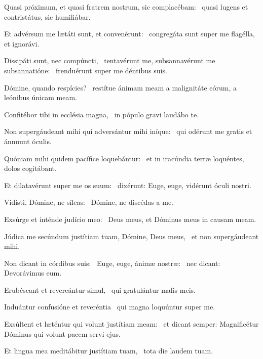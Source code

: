 \item Quasi próximum, et quasi fratrem nostrum, sic complacébam:~\psstar{} quasi lugens et contristátus, sic humiliábar.

\item Et advérsum me lætáti sunt, et convenérunt:~\psstar{} congregáta sunt super me flagélla, et ignorávi.

\item Dissipáti sunt, nec compúncti,~\pscross{} tentavérunt me, subsannavérunt me subsannatióne:~\psstar{} frenduérunt super me déntibus suis.

\item Dómine, quando respícies?~\psstar{} restítue ánimam meam a malignitáte eórum, a leónibus únicam meam.

\item Confitébor tibi in ecclésia magna,~\psstar{} in pópulo gravi laudábo te.

\item Non supergáudeant mihi qui adversántur mihi iníque:~\psstar{} qui odérunt me gratis et ánnuunt óculis.

\item Quóniam mihi quidem pacífice loquebántur:~\psstar{} et in iracúndia terræ loquéntes, dolos cogitábant.

\item Et dilatavérunt super me os suum:~\psstar{} dixérunt: Euge, euge, vidérunt óculi nostri.

\item Vidísti, Dómine, ne síleas:~\psstar{} Dómine, ne discédas a me.

\item Exsúrge et inténde judício meo:~\psstar{} Deus meus, et Dóminus meus in causam meam.

\item Júdica me secúndum justítiam tuam, Dómine, Deus meus,~\psstar{} et non supergáudeant mihi.

\item Non dicant in córdibus suis:~\pscross{} Euge, euge, ánimæ nostræ:~\psstar{} nec dicant: Devorávimus eum.

\item Erubéscant et revereántur simul,~\psstar{} qui gratulántur malis meis.

\item Induántur confusióne et reveréntia~\psstar{} qui magna loquúntur super me.

\item Exsúltent et læténtur qui volunt justítiam meam:~\psstar{} et dicant semper: Magnificétur Dóminus qui volunt pacem servi ejus.

\item Et lingua mea meditábitur justítiam tuam,~\psstar{} tota die laudem tuam.